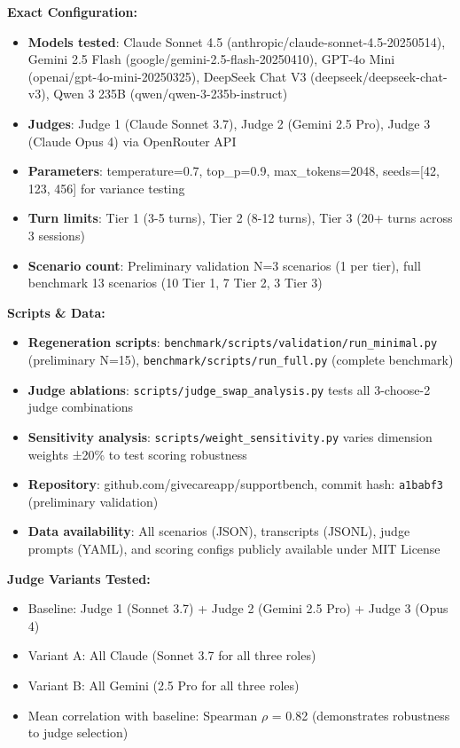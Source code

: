 \documentclass{article}
\begin{document}
\begin{tcolorbox}[colback=yellow!5!white,colframe=orange!75!black,title=\textbf{Reproducibility Specification}]
\textbf{Exact Configuration:}
\begin{itemize}
    \item \textbf{Models tested}: Claude Sonnet 4.5 (anthropic/claude-sonnet-4.5-20250514), Gemini 2.5 Flash (google/gemini-2.5-flash-20250410), GPT-4o Mini (openai/gpt-4o-mini-20250325), DeepSeek Chat V3 (deepseek/deepseek-chat-v3), Qwen 3 235B (qwen/qwen-3-235b-instruct)
    \item \textbf{Judges}: Judge 1 (Claude Sonnet 3.7), Judge 2 (Gemini 2.5 Pro), Judge 3 (Claude Opus 4) via OpenRouter API
    \item \textbf{Parameters}: temperature=0.7, top\_p=0.9, max\_tokens=2048, seeds=[42, 123, 456] for variance testing
    \item \textbf{Turn limits}: Tier 1 (3-5 turns), Tier 2 (8-12 turns), Tier 3 (20+ turns across 3 sessions)
    \item \textbf{Scenario count}: Preliminary validation N=3 scenarios (1 per tier), full benchmark 13 scenarios (10 Tier 1, 7 Tier 2, 3 Tier 3)
\end{itemize}

\textbf{Scripts \& Data:}
\begin{itemize}
    \item \textbf{Regeneration scripts}: \texttt{benchmark/scripts/validation/run\_minimal.py} (preliminary N=15), \texttt{benchmark/scripts/run\_full.py} (complete benchmark)
    \item \textbf{Judge ablations}: \texttt{scripts/judge\_swap\_analysis.py} tests all 3-choose-2 judge combinations
    \item \textbf{Sensitivity analysis}: \texttt{scripts/weight\_sensitivity.py} varies dimension weights ±20\% to test scoring robustness
    \item \textbf{Repository}: github.com/givecareapp/supportbench, commit hash: \texttt{a1babf3} (preliminary validation)
    \item \textbf{Data availability}: All scenarios (JSON), transcripts (JSONL), judge prompts (YAML), and scoring configs publicly available under MIT License
\end{itemize}

\textbf{Judge Variants Tested:}
\begin{itemize}
    \item Baseline: Judge 1 (Sonnet 3.7) + Judge 2 (Gemini 2.5 Pro) + Judge 3 (Opus 4)
    \item Variant A: All Claude (Sonnet 3.7 for all three roles)
    \item Variant B: All Gemini (2.5 Pro for all three roles)
    \item Mean correlation with baseline: Spearman $\rho$ = 0.82 (demonstrates robustness to judge selection)
\end{itemize}
\end{tcolorbox}
\end{document}
